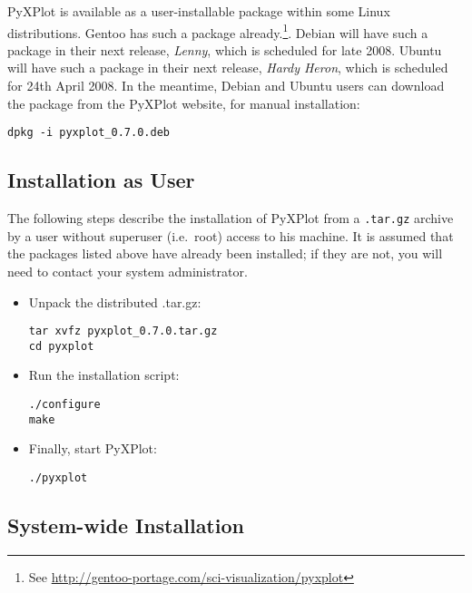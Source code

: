 PyXPlot is available as a user-installable package within some Linux
distributions. Gentoo has such a package already.\footnote{See
\url{http://gentoo-portage.com/sci-visualization/pyxplot}}. Debian will have
such a package in their next release, {\it Lenny}, which is scheduled for late
2008.  Ubuntu will have such a package in their next release, {\it Hardy
Heron}, which is scheduled for 24th April 2008. In the meantime, Debian and
Ubuntu users can download the package from the PyXPlot website, for manual
installation:

\begin{verbatim}
dpkg -i pyxplot_0.7.0.deb
\end{verbatim}

\subsection{Installation as User}

The following steps describe the installation of PyXPlot from a {\tt .tar.gz}
archive by a user without superuser (i.e.\ root) access to his machine. It is
assumed that the packages listed above have already been installed; if they are
not, you will need to contact your system
administrator.

\begin{itemize}
\item Unpack the distributed .tar.gz:

\begin{verbatim}
tar xvfz pyxplot_0.7.0.tar.gz
cd pyxplot
\end{verbatim}

\item Run the installation script:

\begin{verbatim}
./configure
make
\end{verbatim}

\item Finally, start PyXPlot:

\begin{verbatim}
./pyxplot
\end{verbatim}

\end{itemize}

\subsection{System-wide Installation}

